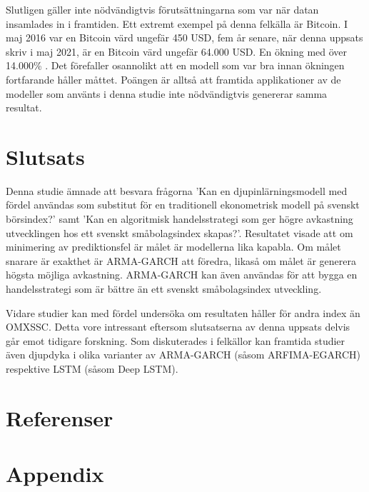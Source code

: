 \documentclass[11pt]{article}
\numberwithin{equation}{section}
\numberwithin{table}{section}
\numberwithin{figure}{section}
\begin{document}
Slutligen gäller inte nödvändigtvis förutsättningarna som var när datan insamlades in i framtiden. Ett extremt exempel på denna felkälla är Bitcoin. I maj 2016 var en Bitcoin värd ungefär 450 USD, fem år senare, när denna uppsats skriv i maj 2021, är en Bitcoin värd ungefär 64.000 USD. En ökning med över 14.000\% \parencite{yahoo_bitcoin}. Det förefaller osannolikt att en modell som var bra innan ökningen fortfarande håller måttet. Poängen är alltså att framtida applikationer av de modeller som använts i denna studie inte nödvändigtvis genererar samma resultat.

\newpage
\section{Slutsats}
Denna studie ämnade att besvara frågorna 'Kan en djupinlärningsmodell med fördel användas som substitut för en traditionell ekonometrisk modell på svenskt börsindex?' samt 'Kan en algoritmisk handelsstrategi som ger högre avkastning utvecklingen hos ett svenskt småbolagsindex skapas?'. Resultatet visade att om minimering av prediktionsfel är målet är modellerna lika kapabla. Om målet snarare är exakthet är ARMA-GARCH att föredra, likaså om målet är generera högsta möjliga avkastning. ARMA-GARCH kan även användas för att bygga en handelsstrategi som är bättre än ett svenskt småbolagsindex utveckling.

Vidare studier kan med fördel undersöka om resultaten håller för andra index än OMXSSC. Detta vore intressant eftersom slutsatserna av denna uppsats delvis går emot tidigare forskning. Som diskuterades i felkällor kan framtida studier även djupdyka i olika varianter av ARMA-GARCH (såsom ARFIMA-EGARCH) respektive LSTM (såsom Deep LSTM).



\newpage
\section*{Referenser}
\printbibliography[heading=none]



\newpage

\appendix
\section*{Appendix}
\renewcommand{\thesubsection}{\Alph{subsection}}
\end{document}
